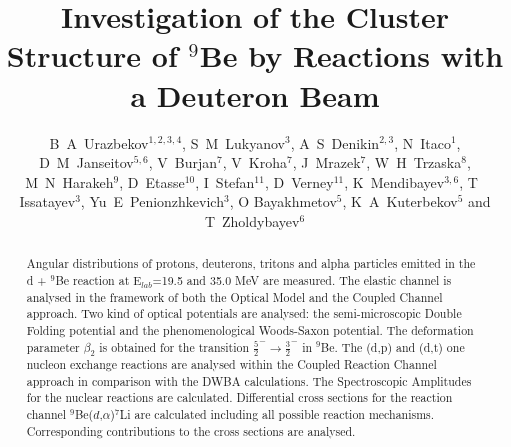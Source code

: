 \documentclass[10pt]{iopart}
\begin{document}
\title[B A Urazbekov \etal ]{Investigation of the Cluster Structure of $^9$Be by Reactions with a Deuteron Beam}

\author{B~A~Urazbekov$^{1,2,3,4}$, S~M~Lukyanov$^3$,  A~S~Denikin$^{2,3}$, N~Itaco$^1$,  D~M~Janseitov$^{5,6}$, V~Burjan$^7$, V~Kroha$^7$, J~Mrazek$^7$, W~H~Trzaska$^8$, M~N~Harakeh$^9$, D~Etasse$^{10}$, I~Stefan$^{11}$, D~Verney$^{11}$, K~Mendibayev$^{3,6}$, T~ Issatayev$^3$, Yu~E~Penionzhkevich$^{3}$,   O Bayakhmetov$^{5}$, K~A~Kuterbekov$^{5}$ and T~Zholdybayev$^{6}$}

\address{$^1$ Dipartimento di Matematica e Fisica,
Universit\`{a} degli Studi della Campania “Luigi Vanvitelli”, I-8110 Caserta, Italy}
\address{$^2$ Dubna State University, 141982 Dubna, Russia}
\address{$^3$ Joint Institute for nuclear research,  141980 Dubna, Russia}
\address{$^4$ Al-Farabi Kazakh National University, 050040 Almaty, Kazakhstan }
\address{$^5$ L~N~Gumilyov Eurasian National University, 010008 Astana, Kazakhstan }
\address{$^6$ Institute of Nuclear Physics, 050032 Almaty, Kazakhstan}
\address{$^7$ Nuclear Physics Institute CAS, 25068 \v{R}e\v{z}, Czech Republic}
\address{$^8$ Department of Physics, University of Jyv\"askyl\"a, FIN-40014 Jyv\"askyl\"a, Finland}
\address{$^9$ KVI-CART, University of Groningen, 9747 AA Groningen, The Netherlands}
\address{$^{10}$ Normandie Universit\'{e}, ENSICAEN, UNICAEN, CNRS/IN2P3, LPC Caen, 14000 Caen, France}
\address{$^{11}$ Institut de Physique Nucl\'{e}aire, Univ. Paris-Sud, Universit\'{e} Paris-Saclay, F-91406 Orsay, France}

\begin{abstract}
Angular distributions of protons, deuterons, tritons and alpha particles emitted in
the d + $^{9}$Be reaction  at E$_{lab}$=19.5 and 35.0 MeV are measured.
The elastic channel is analysed in the framework of both the Optical Model and  the Coupled Channel approach. 
Two kind of optical potentials are analysed: the semi-microscopic Double Folding potential and the phenomenological Woods-Saxon potential. 
The deformation parameter $\beta_2$ is obtained for the transition $\frac{5}{2}^{-} \rightarrow \frac{3}{2}^{-} $ in $^9$Be. 
The (d,p) and (d,t) one nucleon exchange reactions are analysed within the Coupled Reaction Channel approach in comparison with the DWBA calculations. The Spectroscopic Amplitudes for the nuclear reactions are calculated. 
Differential cross sections for the reaction channel ${^9}$Be($d$,$\alpha$)$^7$Li are calculated including  all possible reaction mechanisms. Corresponding contributions to the cross sections are analysed. 

\end{abstract}
\end{document}
